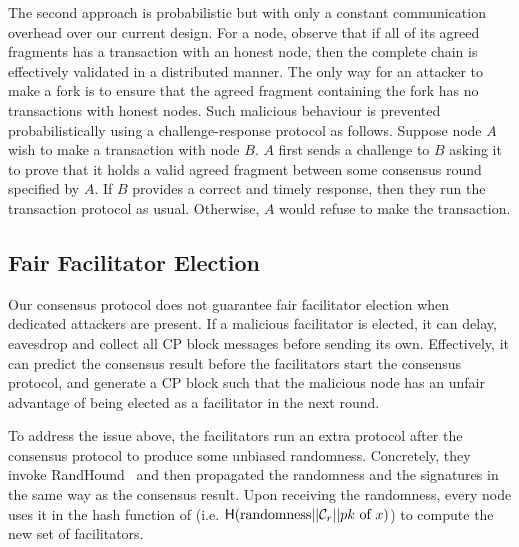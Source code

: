 The second approach is probabilistic but with only a constant communication overhead over our current design.
For a node, observe that if all of its agreed fragments has a transaction with an honest node,
then the complete chain is effectively validated in a distributed manner.
The only way for an attacker to make a fork is to ensure that the agreed fragment containing the fork has no transactions with honest nodes.
Such malicious behaviour is prevented probabilistically using a challenge-response protocol as follows.
Suppose node $A$ wish to make a transaction with node $B$.
$A$ first sends a challenge to $B$ asking it to prove that it holds a valid agreed fragment between some consensus round specified by $A$.
If $B$ provides a correct and timely response, then they run the transaction protocol as usual.
Otherwise, $A$ would refuse to make the transaction.

\subsection{Fair Facilitator Election}
Our consensus protocol does not guarantee fair facilitator election when dedicated attackers are present.
If a malicious facilitator is elected, it can delay, eavesdrop and collect all CP block messages before sending its own.
Effectively, it can predict the consensus result before the facilitators start the consensus protocol, and generate a CP block such that the malicious node has an unfair advantage of being elected as a facilitator in the next round.

To address the issue above,
the facilitators run an extra protocol after the consensus protocol to produce some unbiased randomness.
Concretely, they invoke RandHound~\cite{syta2017scalable} and then propagated the randomness and the signatures in the same way as the consensus result.
Upon receiving the randomness,
every node uses it in the hash function of  (i.e. $\textsf{H}(\text{randomness} || \mathcal{C}_r || pk \text{ of } x)$) to compute the new set of facilitators.

